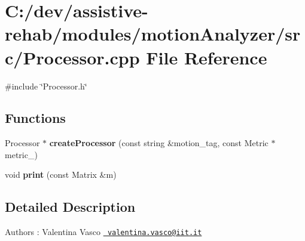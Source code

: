 \section{C\+:/dev/assistive-\/rehab/modules/motion\+Analyzer/src/\+Processor.cpp File Reference}
\label{Processor_8cpp}
{\ttfamily \#include \char`\"{}Processor.\+h\char`\"{}}\newline
\subsection*{Functions}
\begin{DoxyCompactItemize}
\item 
\mbox{\label{Processor_8cpp_a85130106922bad61fd5b7e33a1c9d7fd}} 
Processor $\ast$ {\bfseries create\+Processor} (const string \&motion\+\_\+tag, const Metric $\ast$metric\+\_\+)
\item 
\mbox{\label{Processor_8cpp_a9ed8164d10bb492e02ff6bad278676ee}} 
void {\bfseries print} (const Matrix \&m)
\end{DoxyCompactItemize}


\subsection{Detailed Description}
\begin{DoxyAuthor}{Authors}
\+: Valentina Vasco \href{mailto:valentina.vasco@iit.it}{\texttt{ valentina.\+vasco@iit.\+it}} 
\end{DoxyAuthor}
